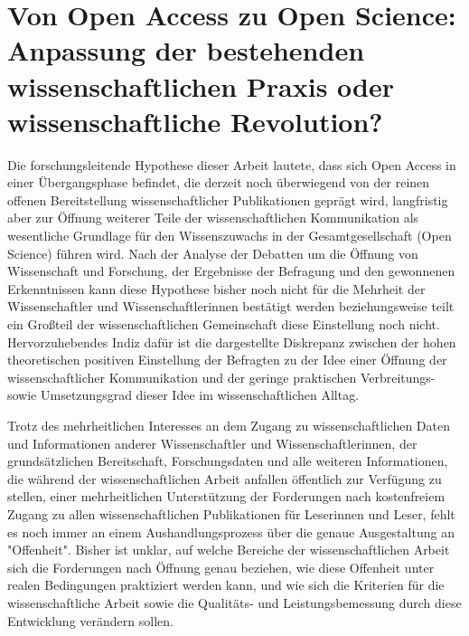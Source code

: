 \section{Von Open Access zu Open Science: Anpassung der bestehenden wissenschaftlichen Praxis oder wissenschaftliche Revolution?}

Die forschungsleitende Hypothese dieser Arbeit lautete, dass sich Open Access in einer Übergangsphase befindet, die derzeit noch überwiegend von der reinen offenen Bereitstellung wissenschaftlicher Publikationen geprägt wird, langfristig aber zur Öffnung weiterer Teile der wissenschaftlichen Kommunikation als wesentliche Grundlage für den Wissenszuwachs in der Gesamtgesellschaft (Open Science) führen wird. Nach der Analyse der Debatten um die Öffnung von Wissenschaft und Forschung, der Ergebnisse der Befragung und den gewonnenen Erkenntnissen kann diese Hypothese bisher noch nicht für die Mehrheit der Wissenschaftler und Wissenschaftlerinnen bestätigt werden beziehungsweise teilt ein Großteil der wissenschaftlichen Gemeinschaft diese Einstellung noch nicht. Hervorzuhebendes Indiz dafür ist die dargestellte Diskrepanz zwischen der hohen theoretischen positiven Einstellung der Befragten zu der Idee einer Öffnung der wissenschaftlicher Kommunikation und der geringe praktischen Verbreitungs- sowie Umsetzungsgrad dieser Idee im wissenschaftlichen Alltag.

Trotz des mehrheitlichen Interesses an dem Zugang zu wissenschaftlichen Daten und Informationen anderer Wissenschaftler und Wissenschaftlerinnen, der grundsätzlichen Bereitschaft, Forschungsdaten und alle weiteren Informationen, die während der wissenschaftlichen Arbeit anfallen öffentlich zur Verfügung zu stellen, einer mehrheitlichen Unterstützung der Forderungen nach kostenfreiem Zugang zu allen wissenschaftlichen Publikationen für Leserinnen und Leser, fehlt es noch immer an einem Aushandlungsprozess über die genaue Ausgestaltung an "Offenheit". Bisher ist unklar, auf welche Bereiche der wissenschaftlichen Arbeit sich die Forderungen nach Öffnung genau beziehen, wie diese Offenheit unter realen Bedingungen praktiziert werden kann, und wie sich die Kriterien für die wissenschaftliche Arbeit sowie die Qualitäts- und Leistungsbemessung durch diese Entwicklung verändern sollen.

